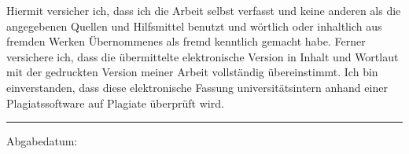 \vspace*{\fill}  
Hiermit versicher ich, dass ich die Arbeit selbst verfasst und keine anderen als die 
angegebenen Quellen und Hilfsmittel benutzt und wörtlich oder inhaltlich aus fremden 
Werken Übernommenes als fremd kenntlich gemacht habe. Ferner versichere ich, dass die
übermittelte elektronische Version in Inhalt und Wortlaut mit der gedruckten Version
meiner Arbeit vollständig übereinstimmt. Ich bin einverstanden, dass diese
elektronische Fassung universitätsintern anhand einer Plagiatssoftware auf Plagiate
überprüft wird.

\vspace{1cm}


\par\noindent\rule{0.3\textwidth}{0.1pt}
\newline
Abgabedatum:
\vspace*{\fill}